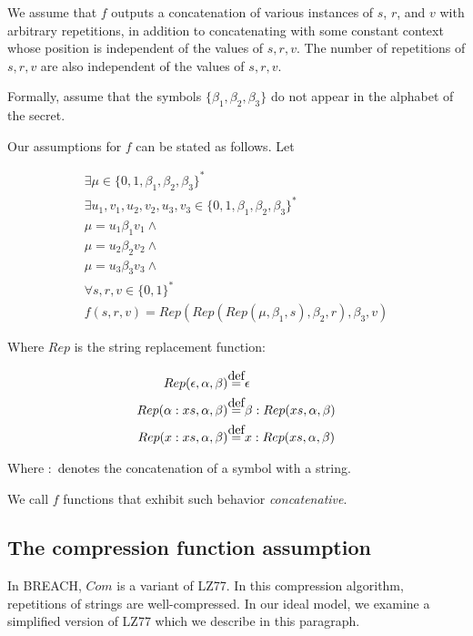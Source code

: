 \documentclass[a4paper, 11 pt, conference]{article}
\newcommand\defeq{\stackrel{\mathclap{\normalfont\mbox{def}}}{=}}
\begin{document}
We assume that $f$ outputs a concatenation of various instances of $s$, $r$,
and $v$ with arbitrary repetitions, in addition to concatenating with some
constant context whose position is independent of the values of $s, r, v$.  The
number of repetitions of $s, r, v$ are also independent of the values of $s, r,
v$.

Formally, assume that the symbols $\{\beta_1, \beta_2, \beta_3\}$ do not appear
in the alphabet of the secret.

Our assumptions for $f$ can be stated as follows. Let

\begin{equation*}
\begin{split}
\exists \mu \in \{0, 1, \beta_1, \beta_2, \beta_3\}^*\\
\exists u_1, v_1, u_2, v_2, u_3, v_3 \in \{0, 1, \beta_1, \beta_2, \beta_3\}^*\\
\mu = u_1 \beta_1 v_1 \land\\
\mu = u_2 \beta_2 v_2 \land\\
\mu = u_3 \beta_3 v_3 \land\\
\forall s, r, v \in \{0, 1\}^*\\
f(s, r, v) = Rep(Rep(Rep(\mu, \beta_1, s), \beta_2, r), \beta_3, v)
\end{split}
\end{equation*}

Where $Rep$ is the string replacement function:

\begin{align*}
Rep(\epsilon, \alpha, \beta) &\defeq \epsilon\\
Rep(\alpha:xs, \alpha, \beta) &\defeq \beta:Rep(xs, \alpha, \beta)\\
Rep(x:xs, \alpha, \beta) &\defeq x:Rep(xs, \alpha, \beta)
\end{align*}

Where $:$ denotes the concatenation of a symbol with a string.

We call $f$ functions that exhibit such behavior \textit{concatenative}.

\subsection{The compression function assumption}\label{subsec:comfuncassumption}

In BREACH, $Com$ is a variant of LZ77. In this compression algorithm,
repetitions of strings are well-compressed. In our ideal model, we examine a
simplified version of LZ77 which we describe in this paragraph.
\end{document}
